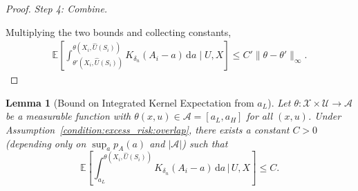 \documentclass[12pt]{article}
\newtheorem{lemma}{Lemma}%
\newcommand{\E}{\mathbb{E}}
\begin{document}
\begin{proof}
\noindent\textit{Step 4: Combine.}

Multiplying the two bounds and collecting constants,
\begin{align}
\E\!\left[\int_{\theta'(X_i,\widehat{U}(S_i))}^{\theta(X_i,\widehat{U}(S_i))}K_{\delta_n}(A_i-a)\,\mathrm{d}a\;\Bigg|\;U,X\right]
\leq C'\|\theta-\theta'\|_\infty.\label{eq:kernel_int_diff_exp}
\end{align}
\end{proof}

\begin{lemma}[Bound on Integrated Kernel Expectation from $a_L$]\label{lemma:kernel_int_theta_bound}
Let $\theta:\mathcal{X}\times\mathcal{U}\to\mathcal{A}$ be a measurable function with $\theta(x,u)\in\mathcal{A}=[a_L,a_H]$ for all $(x,u)$.  Under Assumption~\ref{condition:excess_risk:overlap}, there exists a constant $C>0$ (depending only on $\sup_a p_A(a)$ and $|\mathcal{A}|$) such that
$$\E\!\left[\int_{a_L}^{\theta(X_i,\widehat{U}(S_i))} K_{\delta_n}(A_i-a)\,\mathrm{d}a\,\bigg|\,U,X\right] \leq C.$$
\end{lemma}
\end{document}
